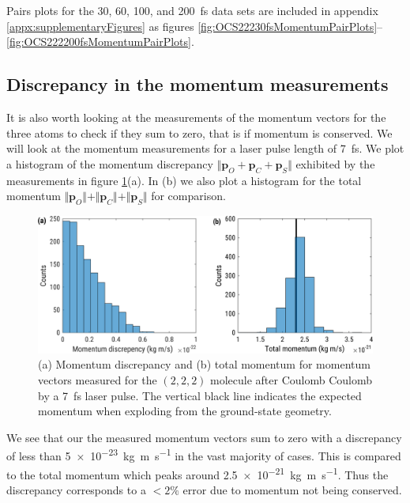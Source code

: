 Pairs plots for the 30, 60, 100, and \SI{200}{\fs} data sets are included in appendix \ref{appx:supplementaryFigures} as figures \ref{fig:OCS22230fsMomentumPairPlots}--\ref{fig:OCS222200fsMomentumPairPlots}.

\subsection{Discrepancy in the momentum measurements} \label{ssec:momentumDiscrepency}
It is also worth looking at the measurements of the momentum vectors for the three atoms to check if they sum to zero, that is if momentum is conserved. We will look at the momentum measurements for a laser pulse length of \SI{7}{\fs}. We plot a histogram of the momentum discrepancy $\Vert \mathbf{p}_O + \mathbf{p}_C + \mathbf{p}_S \Vert$ exhibited by the measurements in figure \ref{fig:OCS2227fsMomentumDiscrepency}(a). In (b) we also plot a histogram for the total momentum $\Vert \mathbf{p}_O \Vert + \Vert \mathbf{p}_C \Vert + \Vert \mathbf{p}_S \Vert$ for comparison.

\begin{figure}
  \centering
  \includegraphics[width=\textwidth]{Plots/OCS2227fsMomentumError}
  \caption[Discrepancy in the momentum measurements.]
  {(a) Momentum discrepancy and (b) total momentum for momentum vectors measured for the  $(2,2,2)$ molecule after Coulomb Coulomb by a \SI{7}{\fs} laser pulse. The vertical black line indicates the expected momentum when exploding from the ground-state geometry.}
  \label{fig:OCS2227fsMomentumDiscrepency}
\end{figure}

We see that our the measured momentum vectors sum to zero with a discrepancy of less than \SI{5e-23}{\kilogram\metre\per\second} in the vast majority of cases. This is compared to the total momentum which peaks around \SI{2.5e-21}{\kilogram\metre\per\second}. Thus the discrepancy corresponds to a $<2\%$ error due to momentum not being conserved.

